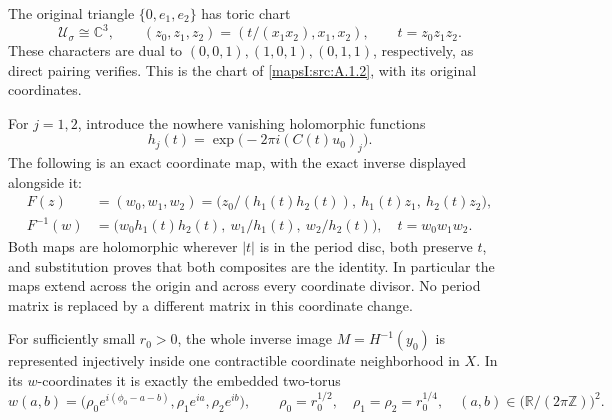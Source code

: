 The original triangle \(\{0,e_1,e_2\}\) has toric chart
\begin{equation}
 \mathcal U_\sigma\cong\mathbb C^3,\qquad
 (z_0,z_1,z_2)=(t/(x_1x_2),x_1,x_2),\qquad
 t=z_0z_1z_2.
 \label{wb:h24:ret:eq:z-chart}
\end{equation}
These characters are dual to \((0,0,1),(1,0,1),(0,1,1)\), respectively,
as direct pairing verifies.  This is the chart of
\cref{mapsI:src:A.1.2}, with its original coordinates.

For \(j=1,2\), introduce the nowhere vanishing holomorphic functions
\begin{equation}
 h_j(t)=\exp\bigl(-2\pi i(C(t)u_0)_j\bigr).
 \label{wb:h24:ret:eq:units}
\end{equation}
The following is an exact coordinate map, with the exact inverse
displayed alongside it:
\begin{align}
 F(z)&=(w_0,w_1,w_2)
 =\bigl(z_0/(h_1(t)h_2(t)),\ h_1(t)z_1,\ h_2(t)z_2\bigr),
 \label{wb:h24:ret:eq:F}\\
 F^{-1}(w)&=
 \bigl(w_0h_1(t)h_2(t),\ w_1/h_1(t),\ w_2/h_2(t)\bigr),
 \quad t=w_0w_1w_2.
 \label{wb:h24:ret:eq:Finv}
\end{align}
Both maps are holomorphic wherever \(|t|\) is in the period disc,
both preserve \(t\), and substitution proves that both composites are
the identity.  In particular the maps extend across the origin and
across every coordinate divisor.  No period matrix is replaced by a
different matrix in this coordinate change.

\begin{lemma}\label{wb:h24:ret:chart-lemma}

For sufficiently small \(r_0>0\), the whole inverse image
\(M=H^{-1}(y_0)\) is represented injectively inside one contractible
coordinate neighborhood in \(X\).  In its \(w\)-coordinates it is
exactly the embedded two-torus
\begin{equation}
 w(a,b)=
 \bigl(\rho_0e^{i(\phi_0-a-b)},\rho_1e^{ia},\rho_2e^{ib}\bigr),
 \qquad
 \rho_0=r_0^{1/2},\quad \rho_1=\rho_2=r_0^{1/4},
 \quad (a,b)\in\bigl(\mathbb R/(2\pi\mathbb Z)\bigr)^2.
 \label{wb:h24:ret:eq:M}
\end{equation}
\end{lemma}



